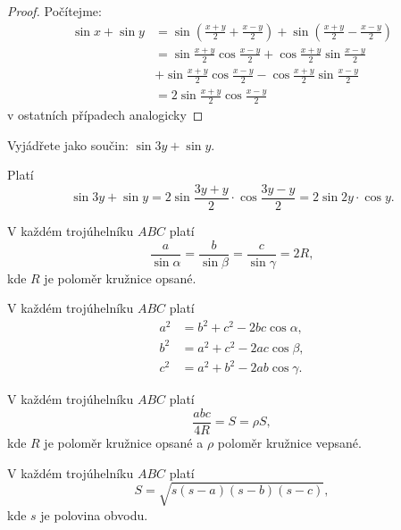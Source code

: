 \begin{proof}
    Počítejme:
    \begin{align*}
        \sin x + \sin y & = \sin \left(\frac{x+y}{2}+\frac{x-y}{2}\right)+ \sin \left(\frac{x+y}{2}-\frac{x-y}{2}\right ) \\
        & = \sin \frac{x+y}{2} \cos\frac{x-y}{2} + \cos\frac{x+y}{2} \sin \frac{x-y}{2} \\
        & + \sin \frac{x+y}{2} \cos\frac{x-y}{2} -  \cos\frac{x+y}{2} \sin \frac{x-y}{2}\\
        & = 2\sin \frac{x+y}{2} \cos\frac{x-y}{2}
    \end{align*}
  v ostatních případech analogicky
\end{proof}

\begin{priklad}
Vyjádřete jako součin: $\sin 3y+\sin y.$
\end{priklad}

\begin{reseni}
Platí
$$\sin 3y+\sin y=2\sin \frac{3y+y}{2}\cdot \cos \frac{3y-y}{2}=2\sin 2y \cdot \cos y.$$
\end{reseni}

\begin{veta}
    V každém trojúhelníku $ABC$ platí
    $$\frac{a}{\sin \alpha} = \frac{b}{\sin \beta}=\frac{c}{\sin \gamma}=2R,$$
    kde $R$ je poloměr kružnice opsané.
\end{veta}

\begin{veta}
 V každém trojúhelníku $ABC$ platí
 \begin{align*}
    a^2 &= b^2+c^2-2bc\cos \alpha, \\
    b^2 &= a^2+c^2-2ac\cos \beta ,\\
    c^2 &= a^2+b^2-2ab\cos \gamma.
 \end{align*}
\end{veta}

\begin{veta}\label{obsahtroj}
     V každém trojúhelníku $ABC$ platí
     $$\frac{abc}{4R}=S=\rho S,$$
     kde $R$ je poloměr kružnice opsané a $\rho$ poloměr kružnice vepsané.
\end{veta}

\begin{veta}
    V každém trojúhelníku $ABC$ platí
    $$S=\sqrt{s(s-a)(s-b)(s-c)}, $$
    kde $s$ je polovina obvodu.
\end{veta}


